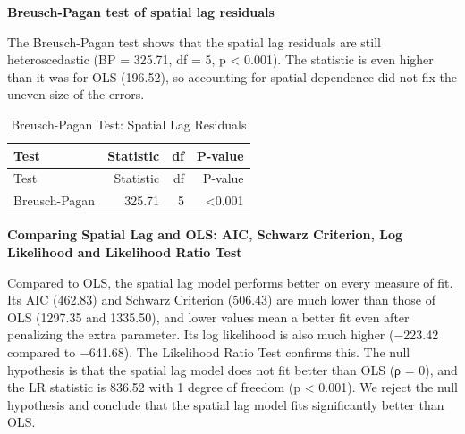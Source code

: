 \documentclass[
  12pt,
]{article}
\begin{document}
\textbf{Breusch-Pagan test of spatial lag residuals}

The Breusch-Pagan test shows that the spatial lag residuals are still
heteroscedastic (BP = 325.71, df = 5, p \textless{} 0.001). The
statistic is even higher than it was for OLS (196.52), so accounting for
spatial dependence did not fix the uneven size of the errors.

\begin{longtable}[]{@{}lrrr@{}}
\caption{Breusch-Pagan Test: Spatial Lag Residuals}\tabularnewline
\toprule\noalign{}
Test & Statistic & df & P-value \\
\midrule\noalign{}
\endfirsthead
\toprule\noalign{}
Test & Statistic & df & P-value \\
\midrule\noalign{}
\endhead
\bottomrule\noalign{}
\endlastfoot
Breusch-Pagan & 325.71 & 5 & \textless0.001 \\
\end{longtable}

\textbf{Comparing Spatial Lag and OLS: AIC, Schwarz Criterion, Log
Likelihood and Likelihood Ratio Test}

Compared to OLS, the spatial lag model performs better on every measure
of fit. Its AIC (462.83) and Schwarz Criterion (506.43) are much lower
than those of OLS (1297.35 and 1335.50), and lower values mean a better
fit even after penalizing the extra parameter. Its log likelihood is
also much higher (−223.42 compared to −641.68). The Likelihood Ratio
Test confirms this. The null hypothesis is that the spatial lag model
does not fit better than OLS (ρ = 0), and the LR statistic is 836.52
with 1 degree of freedom (p \textless{} 0.001). We reject the null
hypothesis and conclude that the spatial lag model fits significantly
better than OLS.
\end{document}
